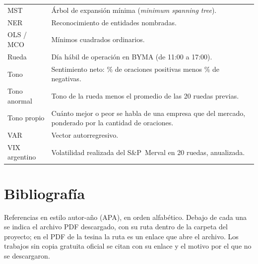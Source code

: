 \documentclass[11pt,a4paper,oneside]{report}
\begin{document}
\begin{longtable}{@{}L{2.6cm}L{11.3cm}@{}}
MST & Árbol de expansión mínima (\textit{minimum spanning tree}). \\
NER & Reconocimiento de entidades nombradas. \\
OLS / MCO & Mínimos cuadrados ordinarios. \\
Rueda & Día hábil de operación en BYMA (de 11:00 a 17:00). \\
Tono & Sentimiento neto: \% de oraciones positivas menos \% de negativas. \\
Tono anormal & Tono de la rueda menos el promedio de las 20 ruedas previas. \\
Tono propio & Cuánto mejor o peor se habla de una empresa que del mercado, ponderado por la cantidad de oraciones. \\
VAR & Vector autorregresivo. \\
VIX argentino & Volatilidad realizada del S\&P~Merval en 20 ruedas, anualizada. \\
\bottomrule
\end{longtable}










\chapter*{Bibliografía}
Referencias en estilo autor-año (APA), en orden alfabético. Debajo de cada una se indica el
archivo PDF descargado, con su ruta dentro de la carpeta del proyecto; en el PDF de la tesina
la ruta es un enlace que abre el archivo. Los trabajos sin copia gratuita oficial se citan con
su enlace y el motivo por el que no se descargaron.
\renewcommand{\bibsection}{}
{\raggedright}


\end{document}
